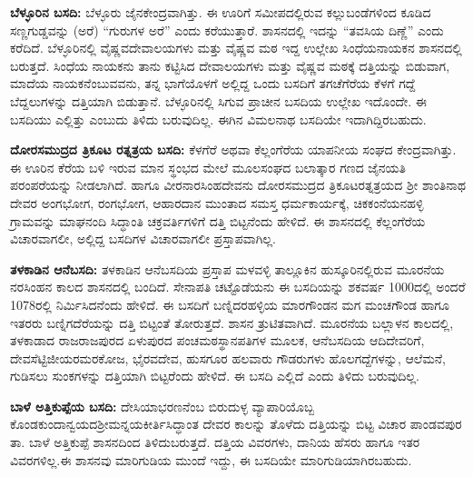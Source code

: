 \textbf{ಬೆಳ್ಳೂರಿನ ಬಸದಿ:} ಬೆಳ್ಳೂರು ಜೈನಕೇಂದ್ರವಾಗಿತ್ತು. ಈ ಊರಿಗೆ ಸಮೀಪದಲ್ಲಿರುವ ಕಲ್ಲುಬಂಡೆಗಳಿಂದ ಕೂಡಿದ ಸಣ್ಣಗುಡ್ಡವನ್ನು (ಅರೆ) “ಗುರುಗಳ ಅರೆ” ಎಂದು ಕರೆಯುತ್ತಾರೆ. ಶಾಸನದಲ್ಲಿ ಇದನ್ನು “ತವಸಿಯ ದಿಣ್ಣೆ” ಎಂದು ಕರೆದಿದೆ. ಬೆಳ್ಳೂರಿನಲ್ಲಿ ವೈಷ್ಣವದೇವಾಲಯಗಳು ಮತ್ತು ವೈಷ್ಣವ ಮಠ ಇದ್ದ ಉಲ್ಲೇಖ ಸಿಂಧೆಯನಾಯಕನ ಶಾಸನದಲ್ಲಿ ಬರುತ್ತದೆ. ಸಿಂಧೆಯ ನಾಯಕನು ತಾನು ಕಟ್ಟಿಸಿದ ದೇವಾಲಯಗಳು ಮತ್ತು ವೈಷ್ಣವ ಮಠಕ್ಕೆ ದತ್ತಿಯನ್ನು ಬಿಡುವಾಗ, ಮಾದೆಯ ನಾಯಕನೆಂಬುವವನು, ತನ್ನ ಭಾಗೆಯೊಳಗೆ ಅಲ್ಲಿದ್ದ ಒಂದು ಬಸದಿಗೆ ತಗಚೆಗೆರೆಯ ಕೆಳಗೆ ಗದ್ದೆ ಬೆದ್ದಲುಗಳನ್ನು ದತ್ತಿಯಾಗಿ ಬಿಡುತ್ತಾನೆ. ಬೆಳ್ಳೂರಿನಲ್ಲಿ ಸಿಗುವ ಪ್ರಾಚೀನ ಬಸದಿಯ ಉಲ್ಲೇಖ ಇದೊಂದೇ. ಈ ಬಸದಿಯು ಎಲ್ಲಿತ್ತು ಎಂಬುದು ತಿಳಿದು ಬರುವುದಿಲ್ಲ. ಈಗಿನ ವಿಮಲನಾಥ ಬಸದಿಯೇ ಇದಾಗಿದ್ದಿರಬಹುದು.

\textbf{ದೋರಸಮುದ್ರದ ತ್ರಿಕೂಟ ರತ್ನತ್ರಯ ಬಸದಿ:} ಕೆಳಗೆರೆ ಅಥವಾ ಕೆಲ್ಲಂಗೆರೆಯ ಯಾಪನೀಯ ಸಂಘದ ಕೇಂದ್ರ\-ವಾಗಿತ್ತು. ಈ ಊರಿನ ಕೆರೆಯ ಬಳಿ ಇರುವ ಮಾನ ಸ್ಥಂಭದ ಮೇಲೆ ಮೂಲಸಂಘದ ಬಲಾತ್ಕಾರ ಗಣದ ಜೈನಯತಿ ಪರಂಪರೆಯನ್ನು ನೀಡಲಾಗಿದೆ. ಹಾಗೂ ವೀರನಾರಸಿಂಹದೇವನು ದೋರಸಮುದ್ರದ ತ್ರಿಕೂಟರತ್ನತ್ರಯದ ಶ‍್ರೀ ಶಾಂತಿನಾಥ ದೇವರ ಅಂಗಭೋಗ, ರಂಗಭೋಗ, ಆಹಾರದಾನ ಮುಂತಾದ ಸಮಸ್ತ ಧರ್ಮಕಾರ್ಯಕ್ಕೆ, ಚಿಕಕಂನೆಯನಹಳ್ಳಿ ಗ್ರಾಮವನ್ನು ಮಾಘನಂದಿ ಸಿದ್ಧಾಂತಿ ಚಕ್ರವರ್ತಿಗಳಿಗೆ ದತ್ತಿ ಬಿಟ್ಟನೆಂದು ಹೇಳಿದೆ. ಈ ಶಾಸನದಲ್ಲಿ ಕೆಲ್ಲಂಗೆರೆಯ ವಿಚಾರವಾಗಲೀ, ಅಲ್ಲಿದ್ದ ಬಸದಿಗಳ ವಿಚಾರವಾಗಲೀ ಪ್ರಸ್ತಾಪವಾಗಿಲ್ಲ.

\textbf{ತಳಕಾಡಿನ ಆನೆಬಸದಿ:} ತಳಕಾಡಿನ ಆನೆಬಸದಿಯ ಪ್ರಸ್ತಾಪ ಮಳವಳ್ಳಿ ತಾಲ್ಲೂಕಿನ ಹುಸ್ಕೂರಿನಲ್ಲಿರುವ ಮೂರನೆಯ ನರಸಿಂಹನ ಕಾಲದ ಶಾಸನದಲ್ಲಿ ಬಂದಿದೆ. ಸೇನಾಪತಿ ಚಟ್ಟೊಡೆಯನು ಈ ಬಸದಿಯನ್ನು ಶಕವರ್ಷ 1000ದಲ್ಲಿ ಅಂದರೆ 1078ರಲ್ಲಿ ನಿರ್ಮಿಸಿದನೆಂದು ಹೇಳಿದೆ. ಈ ಬಸದಿಗೆ ಬಣ್ನಿದರಹಳ್ಳಿಯ ಮಾರಗೌಂಡನ ಮಗ ಮಂಚಗೌಂಡ ಹಾಗೂ ಇತರರು ಬಣ್ನಿಗದೆರೆಯನ್ನು ದತ್ತಿ ಬಿಟ್ಟಂತೆ ತೋರುತ್ತದೆ. ಶಾಸನ ತ್ರುಟಿತವಾಗಿದೆ. ಮೂರನೆಯ ಬಲ್ಲಾಳನ ಕಾಲದಲ್ಲಿ, ತಳಕಾಡಾದ ರಾಜರಾಜಪುರದ ಏಳುಪುರದ ಪಂಚಮಠಸ್ಥಾನಪತಿಗಳ ಮೂಲಕ, ಆನೆಬಸದಿಯ ಆದಿದೇವರಿಗೆ, ದೇವಸೆಟ್ಟಿಜೀಯರ\break ಮರಕೋಜ, ಭೈರವದೇವ, ಹುಸಗೂರ ಹಲವಾರು ಗೌಡರುಗಳು ಹೊಲಗದ್ದೆಗಳನ್ನು, ಆಲೆಮನೆ, ಗುಡಿಸಲು ಸುಂಕಗಳನ್ನು ದತ್ತಿಯಾಗಿ ಬಿಟ್ಟರೆಂದು ಹೇಳಿದೆ. ಈ ಬಸದಿ ಎಲ್ಲಿದೆ ಎಂದು ತಿಳಿದು ಬರುವುದಿಲ್ಲ.

\textbf{ಬಾಳೆ ಅತ್ತಿಕುಪ್ಪೆಯ ಬಸದಿ:} ದೇಸಿಯಾಭರಣನೆಂಬ ಬಿರುದುಳ್ಳ ವ್ಯಾಪಾರಿಯೊಬ್ಬ ಕೊಂಡಕುಂದಾನ್ವಯದ\break ಶ‍್ರೀಮನ್ನಯಕೀರ್ತಿಸಿದ್ಧಾಂತ ದೇವರ ಕಾಲನ್ನು ತೊಳೆದು ದತ್ತಿಯನ್ನು ಬಿಟ್ಟ ವಿಚಾರ ಪಾಂಡವಪುರ ತಾ. ಬಾಳೆ ಅತ್ತಿಕುಪ್ಪೆ ಶಾಸನದಿಂದ ತಿಳಿದುಬರುತ್ತದೆ. ದತ್ತಿಯ ವಿವರಗಳು, ದಾನಿಯ ಹೆಸರು ಹಾಗೂ ಇತರ ವಿವರಗಳಿಲ್ಲ.ಈ ಶಾಸನವು ಮಾರಿಗುಡಿಯ ಮುಂದೆ ಇದ್ದು, ಈ ಬಸದಿಯೇ ಮಾರಿಗುಡಿಯಾಗಿರಬಹುದು.

